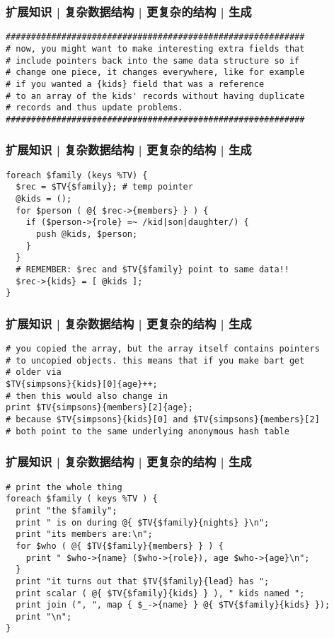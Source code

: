 \begin{frame}[fragile]
  \frametitle{扩展知识 | 复杂数据结构 | 更复杂的结构 | 生成}
\begin{lstlisting}[basicstyle=\small\tt]
###########################################################
# now, you might want to make interesting extra fields that
# include pointers back into the same data structure so if
# change one piece, it changes everywhere, like for example
# if you wanted a {kids} field that was a reference
# to an array of the kids' records without having duplicate
# records and thus update problems.
###########################################################
\end{lstlisting}
\end{frame}

\begin{frame}[fragile]
  \frametitle{扩展知识 | 复杂数据结构 | 更复杂的结构 | 生成}
\begin{lstlisting}
foreach $family (keys %TV) {
  $rec = $TV{$family}; # temp pointer
  @kids = ();
  for $person ( @{ $rec->{members} } ) {
    if ($person->{role} =~ /kid|son|daughter/) {
      push @kids, $person;
    }
  }
  # REMEMBER: $rec and $TV{$family} point to same data!!
  $rec->{kids} = [ @kids ];
}
\end{lstlisting}
\end{frame}

\begin{frame}[fragile]
  \frametitle{扩展知识 | 复杂数据结构 | 更复杂的结构 | 生成}
\begin{lstlisting}
# you copied the array, but the array itself contains pointers
# to uncopied objects. this means that if you make bart get
# older via
$TV{simpsons}{kids}[0]{age}++;
# then this would also change in
print $TV{simpsons}{members}[2]{age};
# because $TV{simpsons}{kids}[0] and $TV{simpsons}{members}[2]
# both point to the same underlying anonymous hash table
\end{lstlisting}
\end{frame}

\begin{frame}[fragile]
  \frametitle{扩展知识 | 复杂数据结构 | 更复杂的结构 | 生成}
\begin{lstlisting}[basicstyle=\small\tt]
# print the whole thing
foreach $family ( keys %TV ) {
  print "the $family";
  print " is on during @{ $TV{$family}{nights} }\n";
  print "its members are:\n";
  for $who ( @{ $TV{$family}{members} } ) {
    print " $who->{name} ($who->{role}), age $who->{age}\n";
  }
  print "it turns out that $TV{$family}{lead} has ";
  print scalar ( @{ $TV{$family}{kids} } ), " kids named ";
  print join (", ", map { $_->{name} } @{ $TV{$family}{kids} });
  print "\n";
}
\end{lstlisting}
\end{frame}


